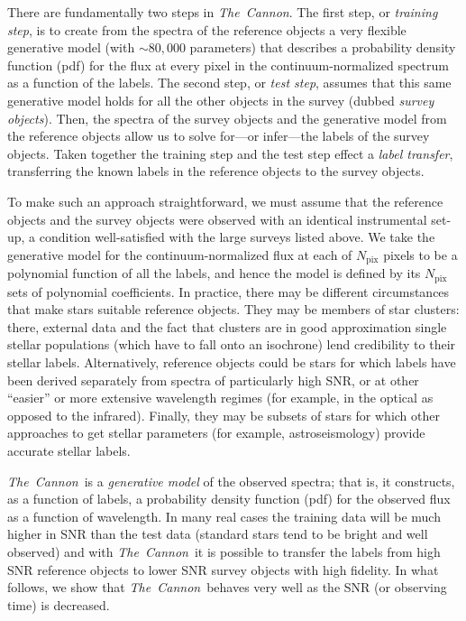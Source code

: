 \documentclass[12pt, preprint]{aastex}
\newcommand{\tc}{\textsl{The~Cannon}}
\newcommand{\pix}{\mathrm{pix}}
\begin{document}
There are fundamentally two steps in \tc. 
The first step, or \textit{training step}, is to create from the spectra of the reference objects a very flexible generative model (with $\sim 80,000$ parameters) that describes a probability density function (pdf) for the flux at every pixel in the continuum-normalized spectrum as a function of the labels.
The second step, or \textit{test step}, assumes that this same generative model holds for all the other objects in the survey (dubbed \textit{survey objects}). 
Then, the spectra of the survey objects and the generative model from the reference objects
allow us to solve for---or infer---the labels of the survey objects. 
Taken together the training step and the test step effect a \textit{label transfer},
transferring the known labels in the reference objects to the survey objects.

To make such an approach straightforward, we must assume that the reference objects and the survey objects were observed with an identical instrumental set-up, a condition well-satisfied with the large surveys listed above. 
We take the generative model for the continuum-normalized flux at each of $N_\pix$ pixels to be a polynomial function of all the labels, and hence the model is defined by its $N_\pix$ sets of polynomial coefficients. In practice, there may be different circumstances that make stars suitable reference objects. 
They may be members of star clusters: there, external data and the fact that clusters are in good approximation single stellar populations (which have to fall onto an isochrone) lend credibility to their stellar labels. 
Alternatively, reference objects could be stars for which labels have been derived separately from spectra of particularly high SNR, or at other ``easier'' or more extensive wavelength regimes (for example, in the optical as opposed to the infrared).  Finally, they may be subsets of stars for which other approaches to get stellar parameters (for example, astroseismology) provide accurate stellar labels.

\tc\ is a \emph{generative model} of the observed spectra; that is, it constructs, as a function of labels, a probability density function (pdf) for the observed flux as a function of wavelength. 
In many real cases the training data will be much higher in SNR than the test data (standard stars tend to be bright and well observed) and with \tc\ it is possible to transfer the labels from high SNR reference objects to lower SNR survey objects with high fidelity. In what follows, we show that \tc\ behaves very well as the SNR (or observing time) is decreased.
\end{document}
